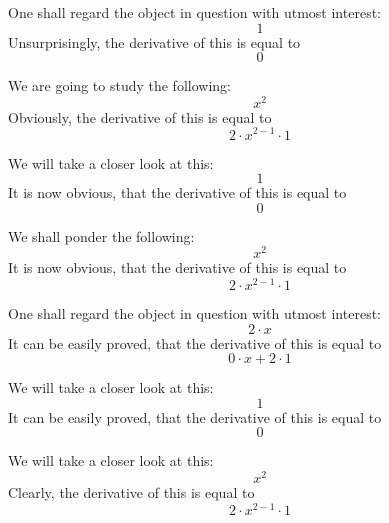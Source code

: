 \documentclass{article}
\begin{document}
One shall regard the object in question with utmost interest:
\begin{equation}
1 
\end{equation}
Unsurprisingly, the derivative of this is equal to
\begin{equation}
0 
\end{equation}

We are going to study the following:
\begin{equation}
x ^{2 } 
\end{equation}
Obviously, the derivative of this is equal to
\begin{equation}
2 \cdot x ^{2 - 1 } \cdot 1 
\end{equation}

We will take a closer look at this:
\begin{equation}
1 
\end{equation}
It is now obvious, that the derivative of this is equal to
\begin{equation}
0 
\end{equation}

We shall ponder the following:
\begin{equation}
x ^{2 } 
\end{equation}
It is now obvious, that the derivative of this is equal to
\begin{equation}
2 \cdot x ^{2 - 1 } \cdot 1 
\end{equation}

One shall regard the object in question with utmost interest:
\begin{equation}
2 \cdot x 
\end{equation}
It can be easily proved, that the derivative of this is equal to
\begin{equation}
0 \cdot x + 2 \cdot 1 
\end{equation}

We will take a closer look at this:
\begin{equation}
1 
\end{equation}
It can be easily proved, that the derivative of this is equal to
\begin{equation}
0 
\end{equation}

We will take a closer look at this:
\begin{equation}
x ^{2 } 
\end{equation}
Clearly, the derivative of this is equal to
\begin{equation}
2 \cdot x ^{2 - 1 } \cdot 1 
\end{equation}
\end{document}
